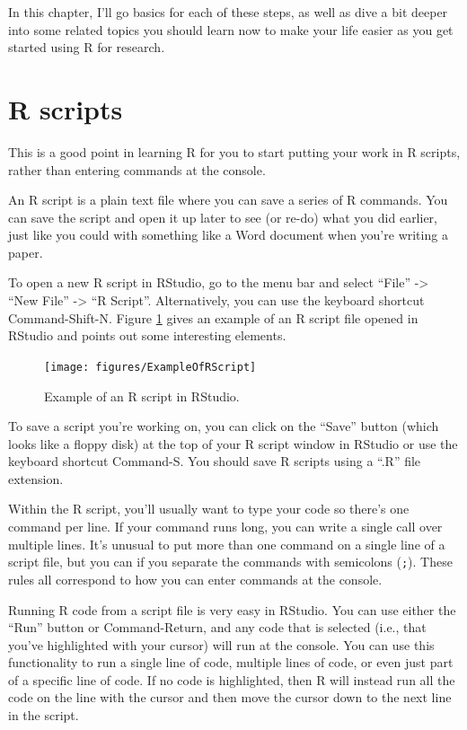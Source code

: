 \documentclass[]{book}
\theoremstyle{definition}
\theoremstyle{definition}
\theoremstyle{definition}
\theoremstyle{remark}
\begin{document}
In this chapter, I'll go basics for each of these steps, as well as dive
a bit deeper into some related topics you should learn now to make your
life easier as you get started using R for research.

\section{R scripts}\label{r-scripts}

This is a good point in learning R for you to start putting your work in
R scripts, rather than entering commands at the console.

An R script is a plain text file where you can save a series of R
commands. You can save the script and open it up later to see (or re-do)
what you did earlier, just like you could with something like a Word
document when you're writing a paper.

To open a new R script in RStudio, go to the menu bar and select
``File'' -\textgreater{} ``New File'' -\textgreater{} ``R Script''.
Alternatively, you can use the keyboard shortcut Command-Shift-N. Figure
\ref{fig:rscript} gives an example of an R script file opened in RStudio
and points out some interesting elements.

\begin{figure}

{\centering \texttt{[image: figures/ExampleOfRScript]} 

}

\caption{Example of an R script in RStudio.}\label{fig:rscript}
\end{figure}

To save a script you're working on, you can click on the ``Save'' button
(which looks like a floppy disk) at the top of your R script window in
RStudio or use the keyboard shortcut Command-S. You should save R
scripts using a ``.R'' file extension.

Within the R script, you'll usually want to type your code so there's
one command per line. If your command runs long, you can write a single
call over multiple lines. It's unusual to put more than one command on a
single line of a script file, but you can if you separate the commands
with semicolons (\texttt{;}). These rules all correspond to how you can
enter commands at the console.

Running R code from a script file is very easy in RStudio. You can use
either the ``Run'' button or Command-Return, and any code that is
selected (i.e., that you've highlighted with your cursor) will run at
the console. You can use this functionality to run a single line of
code, multiple lines of code, or even just part of a specific line of
code. If no code is highlighted, then R will instead run all the code on
the line with the cursor and then move the cursor down to the next line
in the script.
\end{document}
